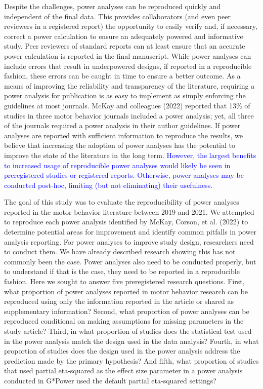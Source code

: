 \documentclass[
  man, donotrepeattitle,mask,floatsintext]{apa7}
\begin{document}
Despite the challenges, power analyses can be reproduced quickly and independent of the final data. This provides collaborators (and even peer reviewers in a registered report) the opportunity to easily verify and, if necessary, correct a power calculation to ensure an adequately powered and informative study. Peer reviewers of standard reports can at least ensure that an accurate power calculation is reported in the final manuscript. While power analyses can include errors that result in underpowered designs, if reported in a reproducible fashion, these errors can be caught in time to ensure a better outcome. As a means of improving the reliability and transparency of the literature, requiring a power analysis for publication is as easy to implement as simply enforcing the guidelines at most journals. McKay and colleagues (2022) reported that 13\% of studies in three motor behavior journals included a power analysis; yet, all three of the journals required a power analysis in their author guidelines. If power analyses are reported with sufficient information to reproduce the results, we believe that increasing the adoption of power analyses has the potential to improve the state of the literature in the long term. \textcolor{blue}{However, the largest benefits to increased usage of reproducible power analyses would likely be seen in preregistered studies or registered reports. Otherwise, power analyses may be conducted post-hoc, limiting (but not eliminating) their usefulness.}

The goal of this study was to evaluate the reproducibility of power analyses reported in the motor behavior literature between 2019 and 2021. We attempted to reproduce each power analysis identified by McKay, Corson, et al. (2022) to determine potential areas for improvement and identify common pitfalls in power analysis reporting. For power analyses to improve study design, researchers need to conduct them. We have already described research showing this has not commonly been the case. Power analyses also need to be conducted properly, but to understand if that is the case, they need to be reported in a reproducible fashion. Here we sought to answer five preregistered research questions. First, what proportion of power analyses reported in motor behavior research can be reproduced using only the information reported in the article or shared as supplementary information? Second, what proportion of power analyses can be reproduced conditional on making assumptions for missing parameters in the study article? Third, in what proportion of studies does the statistical test used in the power analysis match the design used in the data analysis? Fourth, in what proportion of studies does the design used in the power analysis address the prediction made by the primary hypothesis? And fifth, what proportion of studies that used partial eta-squared as the effect size parameter in a power analysis conducted in G*Power used the default partial eta-squared settings?
\end{document}
